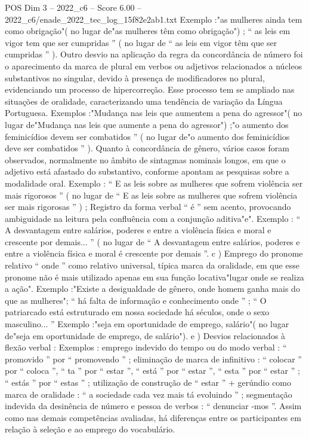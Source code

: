 \begin{textsample}{POS Dim 3 – 2022\_c6 – Score 6.00 – 2022\_c6/enade\_2022\_tec\_log\_15f82e2ab1.txt}
Exemplo :"as mulheres ainda tem como obrigação"( no lugar de"as mulheres têm como obrigação") ; “ as leis em vigor tem que ser cumpridas ” ( no lugar de “ as leis em vigor têm que ser cumpridas ” ).
Outro desvio na aplicação da regra da concordância de número foi o aparecimento da marca de plural em verbos ou adjetivos relacionados a núcleos substantivos no singular, devido à presença de modificadores no plural, evidenciando um processo de hipercorreção.
Esse processo tem se ampliado nas situações de oralidade, caracterizando uma tendência de variação da Língua Portuguesa.
Exemplos :"Mudança nas leis que aumentem a pena do agressor"( no lugar de"Mudança nas leis que aumente a pena do agressor") ;"o aumento dos feminicídios devem ser combatidos ” ( no lugar de"o aumento dos feminicídios deve ser combatidos ” ).
Quanto à concordância de gênero, vários casos foram observados, normalmente no âmbito de sintagmas nominais longos, em que o adjetivo está afastado do substantivo, conforme apontam as pesquisas sobre a modalidade oral.
Exemplo : “ E as leis sobre as mulheres que sofrem violência ser mais rigorosos ” ( no lugar de “ E as leis sobre as mulheres que sofrem violência ser mais rigorosas ” ) ; Registro da forma verbal “ é ” sem acento, provocando ambiguidade na leitura pela confluência com a conjunção aditiva"e".
Exemplo : “ A desvantagem entre salários, poderes e entre a violência física e moral e crescente por demais... ” ( no lugar de “ A desvantagem entre salários, poderes e entre a violência física e moral é crescente por demais ”. c ) Emprego do pronome relativo “ onde ” como relativo universal, típica marca da oralidade, em que esse pronome não é mais utilizado apenas em sua função locativa"lugar onde se realiza a ação".
Exemplo :"Existe a desigualdade de gênero, onde homem ganha mais do que as mulheres"; “ há falta de informação e conhecimento onde ” ; “ O patriarcado está estruturado em nossa sociedade há séculos, onde o sexo masculino... ” Exemplo :"seja em oportunidade de emprego, salário"( no lugar de"seja em oportunidade de emprego, de salário"). e ) Desvios relacionados à flexão verbal : Exemplos : emprego indevido do tempo ou do modo verbal : “ promovido ” por “ promovendo ” ; eliminação de marca de infinitivo : “ colocar ” por “ coloca ”, “ ta ” por “ estar ”, “ está ” por “ estar ”, “ esta ” por “ estar ” ; “ estás ” por “ estas ” ; utilização de construção de “ estar ” + gerúndio como marca de oralidade : “ a sociedade cada vez mais tá evoluindo ” ; segmentação indevida da desinência de número e pessoa de verbos : “ denunciar -mos ”.
Assim como nas demais competências avaliadas, há diferenças entre os participantes em relação à seleção e ao emprego do vocabulário.

\end{textsample}
